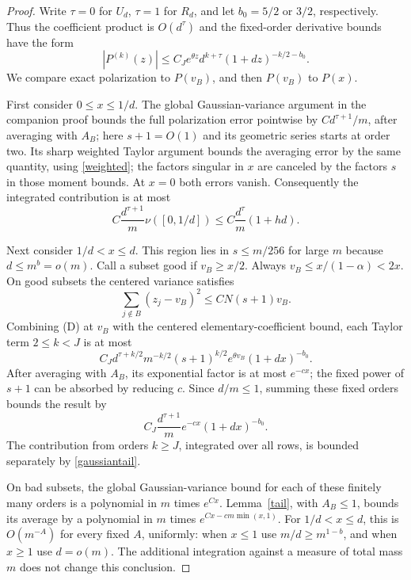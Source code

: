 \documentclass[11pt]{article}
\begin{document}
\begin{proof}
Write $\tau=0$ for $U_d$, $\tau=1$ for $R_d$, and let
$b_0=5/2$ or $3/2$, respectively. Thus the coefficient product is
$O(d^\tau)$ and the fixed-order derivative bounds have the form
\[
 |P^{(k)}(z)|\le C_J e^{\theta z}d^{k+\tau}
                         (1+dz)^{-k/2-b_0}.
\tag{D}
\]
We compare exact polarization to $P(v_B)$, and then $P(v_B)$ to $P(x)$.

First consider $0\le x\le1/d$. The global Gaussian-variance argument
in the companion proof bounds the full polarization error pointwise
by $C d^{\tau+1}/m$, after averaging with $A_B$; here $s+1=O(1)$
and its geometric series starts at order two. Its sharp weighted
Taylor argument bounds the averaging error by the same quantity,
using \eqref{weighted}; the factors singular in $x$ are canceled by
the factors $s$ in those moment bounds. At $x=0$ both errors vanish.
Consequently the integrated contribution is at most
\[
 C\frac{d^{\tau+1}}m\nu([0,1/d])
 \le C\frac{d^\tau}m(1+hd).
\tag{S}
\]

Next consider $1/d<x\le d$. This region lies in $s\le m/256$ for
large $m$ because $d\le m^b=o(m)$. Call a subset good if $v_B\ge x/2$.
Always $v_B\le x/(1-\alpha)<2x$. On good subsets the centered variance
satisfies
\[
 \sum_{j\notin B}(z_j-v_B)^2\le C N(s+1)v_B.
\]
Combining (D) at $v_B$ with the centered elementary-coefficient bound,
each Taylor term $2\le k<J$ is at most
\[
 C_J d^{\tau+k/2}m^{-k/2}(s+1)^{k/2}
                 e^{\theta v_B}(1+dx)^{-b_0}.
\]
After averaging with $A_B$, its exponential factor is at most
$e^{-c x}$; the fixed power of $s+1$ can be absorbed by reducing $c$.
Since $d/m\le1$, summing these fixed orders bounds the result by
\begin{equation}\label{envelope}
 C_J\frac{d^{\tau+1}}m e^{-c x}(1+dx)^{-b_0}.
\end{equation}
The contribution from orders $k\ge J$, integrated over all rows,
is bounded separately by \eqref{gaussiantail}.

On bad subsets, the global Gaussian-variance bound for each of these
finitely many orders is a polynomial in $m$ times $e^{Cx}$.
Lemma~\ref{tail}, with $A_B\le1$, bounds its average by a polynomial
in $m$ times
$e^{Cx-cm\min(x,1)}$. For $1/d<x\le d$, this is
$O(m^{-A})$ for every fixed $A$, uniformly: when $x\le1$ use
$m/d\ge m^{1-b}$, and when $x\ge1$ use $d=o(m)$.
The additional integration against a measure of total mass $m$
does not change this conclusion.


\end{proof}
\end{document}
